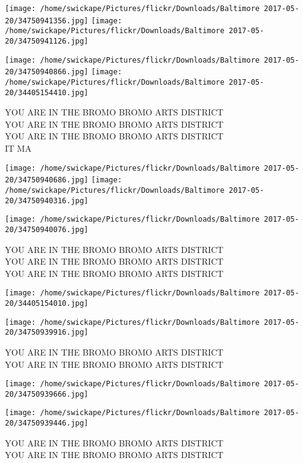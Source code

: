 \documentclass[10pt,letterpaper]{article}
\begin{document}
\texttt{[image: /home/swickape/Pictures/flickr/Downloads/Baltimore 2017-05-20/34750941356.jpg]}
\texttt{[image: /home/swickape/Pictures/flickr/Downloads/Baltimore 2017-05-20/34750941126.jpg]}

\texttt{[image: /home/swickape/Pictures/flickr/Downloads/Baltimore 2017-05-20/34750940866.jpg]}
\texttt{[image: /home/swickape/Pictures/flickr/Downloads/Baltimore 2017-05-20/34405154410.jpg]}

YOU ARE IN THE BROMO BROMO ARTS DISTRICT\\
YOU ARE IN THE BROMO BROMO ARTS DISTRICT\\
YOU ARE IN THE BROMO BROMO ARTS DISTRICT\\
IT MA\\
\pagebreak

\texttt{[image: /home/swickape/Pictures/flickr/Downloads/Baltimore 2017-05-20/34750940686.jpg]}
\texttt{[image: /home/swickape/Pictures/flickr/Downloads/Baltimore 2017-05-20/34750940316.jpg]}

\texttt{[image: /home/swickape/Pictures/flickr/Downloads/Baltimore 2017-05-20/34750940076.jpg]}

YOU ARE IN THE BROMO BROMO ARTS DISTRICT\\
YOU ARE IN THE BROMO BROMO ARTS DISTRICT\\
YOU ARE IN THE BROMO BROMO ARTS DISTRICT\\
\pagebreak

\texttt{[image: /home/swickape/Pictures/flickr/Downloads/Baltimore 2017-05-20/34405154010.jpg]}

\vspace{0.25in}
\texttt{[image: /home/swickape/Pictures/flickr/Downloads/Baltimore 2017-05-20/34750939916.jpg]}

YOU ARE IN THE BROMO BROMO ARTS DISTRICT\\
YOU ARE IN THE BROMO BROMO ARTS DISTRICT\\
\pagebreak

\texttt{[image: /home/swickape/Pictures/flickr/Downloads/Baltimore 2017-05-20/34750939666.jpg]}

\vspace{0.25in}
\texttt{[image: /home/swickape/Pictures/flickr/Downloads/Baltimore 2017-05-20/34750939446.jpg]}

YOU ARE IN THE BROMO BROMO ARTS DISTRICT\\
YOU ARE IN THE BROMO BROMO ARTS DISTRICT\\
\pagebreak
\end{document}
